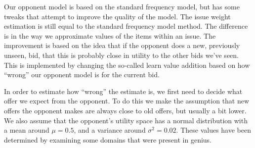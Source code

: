 Our opponent model is based on the standard frequency model, but has some tweaks that attempt to improve the quality of the model. The issue weight estimation is still equal to the standard frequency model method. The difference is in the way we approximate values of the items within an issue. The improvement is based on the idea that if the opponent does a new, previously unseen, bid, that this is probably close in utility to the other bids we've seen. This is implemented by changing the so-called learn value addition based on how ``wrong'' our opponent model is for the current bid. 

In order to estimate how ``wrong'' the estimate is, we first need to decide what offer we expect from the opponent. To do this we make the assumption that new offers the opponent makes are always close to old offers, but usually a bit lower. We also assume that the opponent's utility space has a normal distribution with a mean around $\mu = 0.5$, and a variance around $\sigma^2 = 0.02$. These values have been determined by examining some domains that were present in genius. 